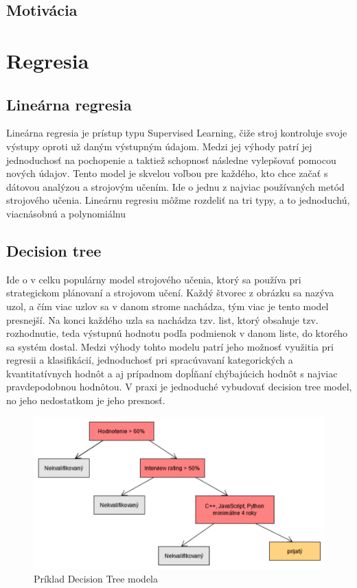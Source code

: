 \documentclass[8pt,twoside,slovak,a4paper]{article}
\begin{document}
\subsection{Motivácia} \label{motivacia}
\newpage
\section{Regresia} 
\subsection{Lineárna regresia}
Lineárna regresia je prístup typu Supervised Learning, čiže stroj kontroluje svoje výstupy oproti už daným výstupným údajom. Medzi jej výhody patrí jej jednoduchosť na pochopenie a taktiež schopnosť následne vylepšovať pomocou nových údajov. Tento model je skvelou voľbou pre každého, kto chce začať s dátovou analýzou a strojovým učením. \cite{quick_review}
\newline \hspace*{0.4cm} Ide o jednu z najviac používaných metód strojového učenia. Lineárnu regresiu môžme rozdeliť na tri typy, a to jednoduchú, viacnásobnú a polynomiálnu
\subsection{Decision tree}
Ide o v celku populárny model strojového učenia, ktorý sa používa pri strategickom plánovaní a strojovom učení. Každý štvorec z obrázku sa nazýva uzol, a čím viac uzlov sa v danom strome nachádza, tým viac je tento model presnejší.  Na konci každého uzla sa nachádza tzv. list, ktorý obsahuje tzv. rozhodnutie, teda výstupnú hodnotu podľa podmienok v danom liste, do ktorého sa systém dostal. 
\newline \hspace*{0.4cm} Medzi výhody tohto modelu patrí jeho možnosť využitia pri regresii a klasifikácií, jednoduchosť pri spracúvavaní kategorických a kvantitatívnych hodnôt a aj prípadnom dopĺňaní chýbajúcich hodnôt s najviac pravdepodobnou hodnôtou.
V praxi je jednoduché vybudovať decision tree model, no jeho nedostatkom je jeho presnosť. \cite{quick_review}
\begin{figure}[h]
\centering
\includegraphics[scale=0.55]{decision_tree}
\caption{Príklad Decision Tree modela}
\end{figure}
\newpage
\end{document}
